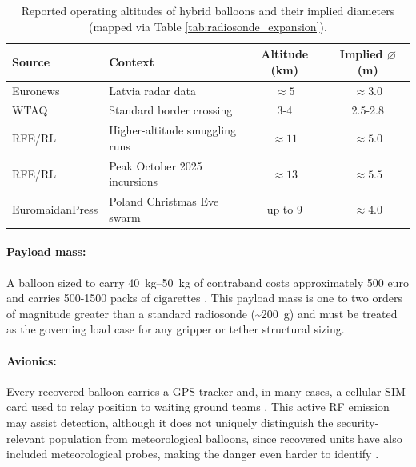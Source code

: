 \begin{table}[H]
\centering
\caption{Reported operating altitudes of hybrid balloons and
  their implied diameters (mapped via Table \ref{tab:radiosonde_expansion}).}
\label{tab:security_balloon_altitudes}
\begin{tabular}{@{}llcc@{}}
\toprule
\textbf{Source} & \textbf{Context} & \textbf{Altitude (km)} & \textbf{Implied $\varnothing$ (m)} \\
\midrule
Euronews \cite{Euronews2025LithuaniaBalloons}   & Latvia radar data        & $\approx 5$  & $\approx 3.0$ \\
WTAQ \cite{WTAQ2025Factbox:Lithuania} & Standard border crossing & 3-4         & 2.5-2.8 \\
RFE/RL \cite{RFE/RLBelarusService2025UpBoth} & Higher-altitude smuggling runs & $\approx 11$ & $\approx 5.0$ \\
RFE/RL \cite{RFE/RLBelarusService2025UpBoth} & Peak October 2025 incursions  & $\approx 13$ & $\approx 5.5$ \\
EuromaidanPress \cite{EuromaidanPress2025PolandEve} & Poland Christmas Eve swarm & up to 9 & $\approx 4.0$ \\
\bottomrule
\end{tabular}
\end{table}
\vspace{-10pt}

\paragraph{Payload mass:}
A balloon sized to carry \SIrange{40}{50}{\kilo\gram} of contraband costs approximately 500 euro and carries 500-1500 packs of
cigarettes \cite{RFE/RLBelarusService2025UpBoth, WTAQ2025Factbox:Lithuania}. This payload mass is one to two orders of magnitude greater than a standard radiosonde (\textasciitilde\SI{200}{\gram}) and must be treated as the governing load case for any gripper or tether structural sizing.
\vspace{-10pt}

\paragraph{Avionics:}
Every recovered balloon carries a GPS tracker and, in many cases, a cellular SIM card used to relay position to waiting ground teams \cite{LRTInvestigationsTeam2025LithuanianBelarus}. This active RF emission may assist detection, although it does not uniquely distinguish the security-relevant population from meteorological balloons, since recovered units have also included meteorological probes, making the danger even harder to identify \cite{EuromaidanPress2025PolandEve}.
\vspace{-10pt}

